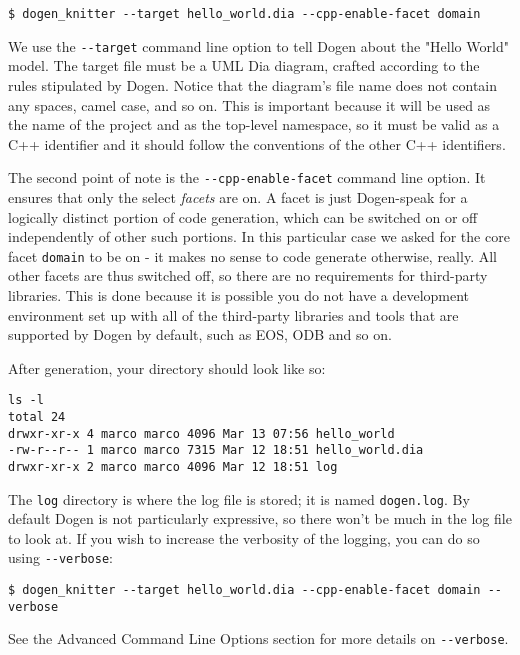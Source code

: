 \documentclass[11pt]{article}
\begin{document}
\begin{verbatim}
$ dogen_knitter --target hello_world.dia --cpp-enable-facet domain
\end{verbatim}

We use the \texttt{-{}-target} command line option to tell Dogen about the
"Hello World" model. The target file must be a UML Dia diagram,
crafted according to the rules stipulated by Dogen. Notice that the
diagram's file name does not contain any spaces, camel case, and so
on. This is important because it will be used as the name of the
project and as the top-level namespace, so it must be valid as a C++
identifier and it should follow the conventions of the other C++
identifiers.

The second point of note is the \texttt{-{}-cpp-enable-facet} command line
option. It ensures that only the select \emph{facets} are on. A facet is
just Dogen-speak for a logically distinct portion of code generation,
which can be switched on or off independently of other such
portions. In this particular case we asked for the core facet \texttt{domain}
to be on - it makes no sense to code generate otherwise, really. All
other facets are thus switched off, so there are no requirements for
third-party libraries. This is done because it is possible you do not
have a development environment set up with all of the third-party
libraries and tools that are supported by Dogen by default, such as
EOS, ODB and so on.

After generation, your directory should look like so:

\begin{verbatim}
ls -l
total 24
drwxr-xr-x 4 marco marco 4096 Mar 13 07:56 hello_world
-rw-r--r-- 1 marco marco 7315 Mar 12 18:51 hello_world.dia
drwxr-xr-x 2 marco marco 4096 Mar 12 18:51 log
\end{verbatim}

The \texttt{log} directory is where the log file is stored; it is named
\texttt{dogen.log}. By default Dogen is not particularly expressive, so there
won't be much in the log file to look at. If you wish to increase the
verbosity of the logging, you can do so using \texttt{-{}-verbose}:

\begin{verbatim}
$ dogen_knitter --target hello_world.dia --cpp-enable-facet domain --verbose
\end{verbatim}

See the Advanced Command Line Options section for more details on
\texttt{-{}-verbose}.
\end{document}
